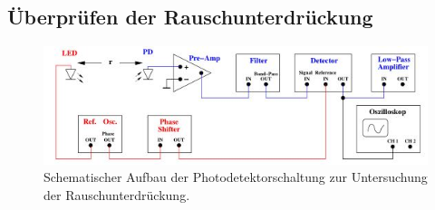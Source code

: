 \subsection{Überprüfen der Rauschunterdrückung}
\begin{figure}[H]
    \centering
    \includegraphics{images/photo.JPG}
    \caption{Schematischer Aufbau der Photodetektorschaltung zur Untersuchung der Rauschunterdrückung. \cite{sample}}
    \label{fig:photo}
\end{figure}
\noindent
